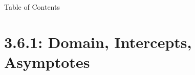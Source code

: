 
\begin{frame}{Table of Contents}

\mapofcontentsC{\cf}
\end{frame}

\section{3.6.1:  Domain, Intercepts, Asymptotes}


